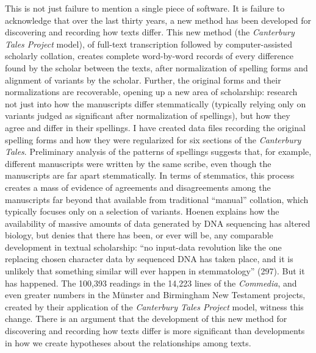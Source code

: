 \begin{review}
This is not just failure to mention a single piece of software.
It is failure to acknowledge that over the last thirty years, a new
method has been developed for discovering and recording how texts
differ. This new method (the \emph{Canterbury Tales Project} model), of
full-text transcription followed by computer-assisted scholarly
collation, creates complete word-by-word records of every difference
found by the scholar between the texts, after normalization of spelling
forms and alignment of variants by the scholar. Further, the original
forms and their normalizations are recoverable, opening up a new area of
scholarship: research not just into how the manuscripts differ
stemmatically (typically relying only on variants judged as significant
after normalization of spellings), but how they agree and differ in
their spellings. I have created data files recording the original
spelling forms and how they were regularized for six sections of the
\emph{Canterbury Tales}. Preliminary analysis of the patterns of
spellings suggests that, for example, different manuscripts were written
by the same scribe, even though the manuscripts are far apart
stemmatically. In terms of stemmatics, this process creates a mass of
evidence of agreements and disagreements among the manuscripts far
beyond that available from traditional ``manual'' collation, which
typically focuses only on a selection of variants. Hoenen explains how
the availability of massive amounts of data generated by DNA sequencing
has altered biology, but denies that there has been, or ever will be,
any comparable development in textual scholarship: ``no input-data
revolution like the one replacing chosen character data by sequenced DNA
has taken place, and it is unlikely that something similar will ever
happen in stemmatology'' (297). But it has happened. The 100,393
readings in the 14,223 lines of the \emph{Commedia}, and even greater
numbers in the Münster and Birmingham New Testament projects, created by
their application of the \emph{Canterbury Tales Project} model, witness
this change. There is an argument that the development of this new
method for discovering and recording how texts differ is more
significant than developments in how we create hypotheses about the
relationships among texts.


\end{review}
